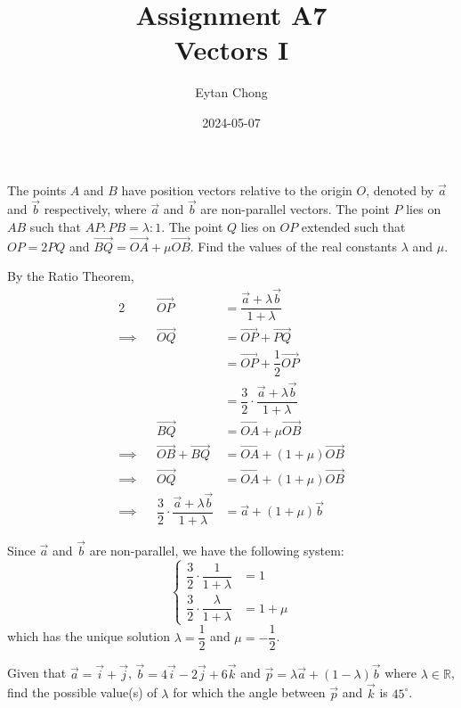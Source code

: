 \documentclass{echw}
\title{Assignment A7\\Vectors I}
\author{Eytan Chong}
\date{2024-05-07}
\begin{document}
    \problem{}
        The points $A$ and $B$ have position vectors relative to the origin $O$, denoted by $\vec a$ and $\vec b$ respectively, where $\vec a$ and $\vec b$ are non-parallel vectors. The point $P$ lies on $AB$ such that $AP : PB = \lambda : 1$. The point $Q$ lies on $OP$ extended such that $OP = 2PQ$ and $\overrightarrow{BQ} = \overrightarrow{OA} + \mu \overrightarrow{OB}$. Find the values of the real constants $\lambda$ and $\mu$.

    \solution
        By the Ratio Theorem,
        \begin{alignat*}{2}
            &&\overrightarrow{OP} &= \dfrac{\vec a + \lambda \vec b}{1 + \lambda}\\
            \implies&&\overrightarrow{OQ} &= \overrightarrow{OP} + \overrightarrow{PQ}\\
            && &= \overrightarrow{OP} + \dfrac12\overrightarrow{OP}\\
            && &= \dfrac32 \cdot \dfrac{\vec a + \lambda \vec b}{1 + \lambda}\\
            &&\overrightarrow{BQ} &= \overrightarrow{OA} + \mu \overrightarrow{OB}\\
            \implies&&\overrightarrow{OB} + \overrightarrow{BQ} &= \overrightarrow{OA} + (1 + \mu)\overrightarrow{OB}\\
            \implies&&\overrightarrow{OQ} &= \overrightarrow{OA} + (1 + \mu)\overrightarrow{OB}\\
            \implies&&\dfrac32 \cdot \dfrac{\vec a + \lambda \vec b}{1 + \lambda} &= \vec a + (1 + \mu)\vec b
        \end{alignat*}

        Since $\vec a$ and $\vec b$ are non-parallel, we have the following system:
        \begin{equation*}
            \begin{cases}
                \dfrac32 \cdot \dfrac1{1 + \lambda} &= 1\\
                \dfrac32 \cdot \dfrac\lambda{1 + \lambda} &= 1 + \mu
            \end{cases}
        \end{equation*}
        \noindent which has the unique solution $\lambda = \dfrac12$ and $\mu = -\dfrac12$.


    \problem{}
        Given that $\vec a = \vec i + \vec j$, $\vec b = 4 \vec i - 2 \vec j + 6 \vec k$ and $\vec p = \lambda \vec a + (1 - \lambda) \vec b$ where $\lambda \in \mathbb{R}$, find the possible value(s) of $\lambda$ for which the angle between $\vec p$ and $\vec k$ is $45^{\circ}$.
\end{document}
